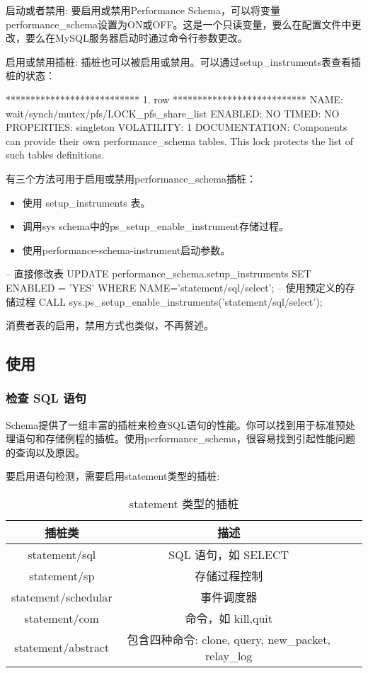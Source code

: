 启动或者禁用: 要启用或禁用Performance Schema，可以将变量performance\_schema设置为ON或OFF。这是一个只读变量，要么在配置文件中更改，要么在MySQL服务器启动时通过命令行参数更改。

启用或禁用插桩: 插桩也可以被启用或禁用。可以通过setup\_instruments表查看插桩的状态：

\begin{bash}
*************************** 1. row ***************************
    NAME: wait/synch/mutex/pfs/LOCK_pfs_share_list
 ENABLED: NO
   TIMED: NO
PROPERTIES: singleton
VOLATILITY: 1
DOCUMENTATION: Components can provide their own performance_schema tables. This lock protects the list of such tables definitions.
\end{bash}

有三个方法可用于启用或禁用performance\_schema插桩：
\begin{itemize}
    \item 使用 setup\_instruments 表。
    \item 调用sys schema中的ps\_setup\_enable\_instrument存储过程。
    \item 使用performance-schema-instrument启动参数。
\end{itemize}

\begin{sql}
-- 直接修改表
UPDATE performance_schema.setup_instruments SET ENABLED = 'YES' WHERE NAME='statement/sql/select';
-- 使用预定义的存储过程
CALL sys.ps_setup_enable_instruments('statement/sql/select');
\end{sql}

消费者表的启用，禁用方式也类似，不再赘述。

\subsection{使用}

\subsubsection*{检查 SQL 语句}

Schema提供了一组丰富的插桩来检查SQL语句的性能。你可以找到用于标准预处理语句和存储例程的插桩。使用performance\_schema，很容易找到引起性能问题的查询以及原因。

要启用语句检测，需要启用statement类型的插桩:

\begin{table}[H]
    \centering
    \caption{statement 类型的插桩}
    \label{table:statement 类型的插桩}
    \setlength{\tabcolsep}{4mm}
    \begin{tabular}{c|ccc}
        \toprule
        \textbf{插桩类} & \textbf{描述} \\
        \midrule
        statement/sql & SQL 语句，如 SELECT \\
        statement/sp & 存储过程控制 \\
        statement/schedular & 事件调度器 \\
        statement/com & 命令，如 kill,quit \\
        statement/abstract & 包含四种命令: clone, query, new\_packet, relay\_log \\
        \bottomrule
    \end{tabular}
\end{table}